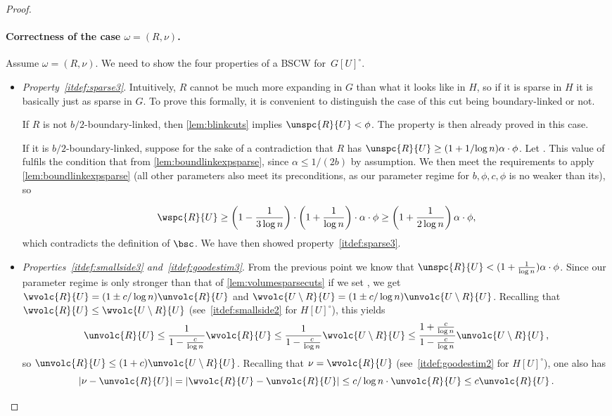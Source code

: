 \begin{proof}[Proof]
	\paragraph{Correctness of the case $\omega=(R,\nu)$.}
Assume $\omega=(R,\nu)$. We need to show the four properties of a BSCW for~$G[U]^\circ$.
	\begin{itemize}
		\item \textit{Property~\eqref{itdef:sparse3}}. Intuitively, $R$ cannot be much more expanding in $G$ than what it looks like in $H$, so if it is sparse in $H$ it is basically just as sparse in $G$. To prove this formally, it is convenient to distinguish the case of this cut being boundary-linked or not.
		
		If $R$ is not $b/2$-boundary-linked, then \cref{lem:blinkcuts} implies $\unspc{R}{U} < \phi$. The property is  then already proved in this case. 
		
		If it is $b/2$-boundary-linked, suppose for the sake of a contradiction that $R$ has {$\unspc{R}{U} \ge (1+{1}/{\log n})\alpha \cdot \phi$}.  Let . This value of \smash{$\hat{\phi}$} fulfils the condition that  from \cref{lem:boundlinkexpsparse}, since $\alpha\le 1/(2b)$ by assumption. We then meet the requirements to apply \cref{lem:boundlinkexpsparse} (all other parameters also meet its preconditions, as our parameter regime for $b,\phi,c,\phi$ is no weaker than its), so
		
		\[
			\wspc{R}{U} \geq \left(1-\frac{1}{3\log n}\right)\cdot \left(1+\frac{1}{\log n}\right)\cdot\alpha \cdot \phi \geq \left(1+\frac{1}{2\log n}\right) \alpha \cdot \phi,
		\]
		which contradicts the definition of $\bsc$. We have then showed property~\eqref{itdef:sparse3}.
		
		
		
		\item \textit{Properties~\eqref{itdef:smallside3} and~\eqref{itdef:goodestim3}}. From the previous point we know that $\unspc{R}{U} <(1+\frac{1}{\log n})\alpha \cdot \phi$. Since our parameter regime is only stronger than that of \cref{lem:volumesparsecuts} if we set , we get $\wvolc{R}{U}= (1 \pm c/\log n)\unvolc{R}{U}$ and $\wvolc{U \setminus R}{U}= (1 \pm c/\log n)\unvolc{U \setminus R}{U}$. Recalling that $\wvolc{R}{U} \le \wvolc{U\setminus R}{U}$ (see~\eqref{itdef:smallside2} for $H[U]^\circ$), this yields
		\begin{equation*}
			\unvolc{R}{U} \le \frac{1}{1-\frac{c}{\log n}} \wvolc{R}{U} \le  \frac{1}{1-\frac{c}{\log n}}\wvolc{U\setminus R}{U} \le \frac{1+\frac{c}{\log n}}{1-\frac{c}{\log n}}\unvolc{U\setminus R}{U} \, ,
		\end{equation*}
		so $\unvolc{R}{U} \le (1+c)\unvolc{U\setminus R}{U}$. Recalling that $\nu = \wvolc{R}{U}$ (see~\eqref{itdef:goodestim2} for $H[U]^\circ$), one also has
		\begin{equation*}
			\left|\nu-\unvolc{R}{U}\right|=\left|\wvolc{R}{U}-\unvolc{R}{U}\right|\le c/\log n \cdot \unvolc{R}{U} \le c \unvolc{R}{U} \, .
		\end{equation*}
		

\end{itemize}
\end{proof}
